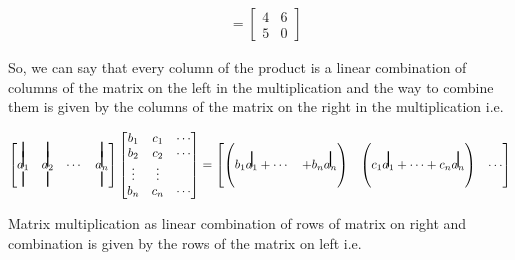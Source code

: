 \documentclass{article}
\newcommand\vstrike[1]{\stackon[0pt]{#1}{\smash{\rule[-3pt]{1pt}{2.9ex}}}}
\begin{document}
\begin{align}
                  &= \begin{bmatrix}
                            4 & 6\\
                            5 & 0
                      \end{bmatrix}\nonumber
\end{align}

So, we can say that every column of the product is a linear combination of columns of the matrix on the left in the multiplication and the way to combine them is given by the columns of the matrix on the right in the multiplication i.e.

\[
    \begin{bmatrix}
        \vstrike{} & \vstrike{} & & \vstrike{}\\
        \vstrike{$a_1$} & \vstrike{$a_2$} & \cdots & \vstrike{$a_n$}\\
      \vstrike{} & \vstrike{} & & \vstrike{}\\
    \end{bmatrix} \begin{bmatrix}
                    b_1 & c_1 & \cdots \\
                    b_2 & c_2 & \cdots \\
                    \vdots & \vdots &   \\
                    b_n & c_n & \cdots
    \end{bmatrix} = \begin{bmatrix}
                \begin{pmatrix}
                \\
                    b_1\vstrike{$a_1$}+\cdots&+b_n\vstrike{$a_n$}\\
                \\
                \end{pmatrix} & \begin{pmatrix}
                \\
                    c_1 \vstrike{$a_1$}+\cdots+c_n\vstrike{$a_n$}\\
                \\    
                \end{pmatrix} &\cdots
    \end{bmatrix}
\]

Matrix multiplication as linear combination of rows of matrix on right and combination is given by the rows of the matrix on left i.e. 
\end{document}

